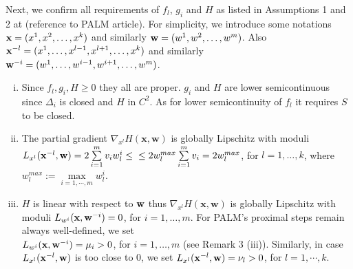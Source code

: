 \documentclass[11pt]{article}
\numberwithin{equation}{section}
\begin{document}
Next, we confirm all requirements of $f_l$, $g_i$ and $H$ as listed in Assumptions 1 and 2 at (reference to PALM article). For simplicity, we introduce some notations ${\bf x} = (x^1, x^{2} , \ldots ,x^{k})$ and similarly ${\bf w} = (w^1, w^{2} , \ldots ,w^{m})$. Also ${\bf x}^{-l} = (x^1, \ldots ,x^{l-1}, x^{l+1}, \ldots ,x^{k})$ and similarly \\ ${\bf w}^{-i} = (w^1, \ldots ,w^{i-1}, w^{i+1}, \ldots ,w^{m})$.
\begin{enumerate}[(i)]
  \item Since $f_l,g_i,H \geq 0$ they all are proper. $g_i$ and $H$ are lower semicontinuous since $\Delta_i$ is closed and $H$ in $C^2$. As for lower semicontinuity of $f_l$ it requires $S$ to be closed.
  \item The partial gradient $\nabla_{x^l}H(\textbf{x}, \textbf{w})$ is globally Lipschitz with moduli $L_{x^l}({\bf x}^{-l}, {\bf w})=2\sum\limits_{i=1}^{m} v_i w_l^i \leq \\ \leq 2w_{l}^{max}\sum\limits_{i=1}^{m} v_i = 2w_{l}^{max}$, for $l=1, \dots ,k$, where $w^{max}_l:=\max\limits_{i=1, \cdots ,m} w^i_l$.
  \item $H$ is linear with respect to ${\bf w}$ thus $\nabla_{x^l}H(\textbf{x}, \textbf{w})$ is globally Lipschitz with moduli $L_{w^i}({\bf x}, {\bf w}^{-i})=0$, for $i=1, \dots ,m$. For PALM's proximal steps remain always well-defined, we set \\ $L_{w^i}({\bf x}, {\bf w}^{-i})= \mu_i > 0$, for $i=1, \dots ,m$ (see Remark 3 (iii)). Similarly, in case $L_{x^l}({\bf x}^{-l}, {\bf w})$ is too close to $0$, we set $L_{x^l}({\bf x}^{-l}, {\bf w}) = \nu_l >0$, for $l=1, \cdots ,k$.

\end{enumerate}
\end{document}
